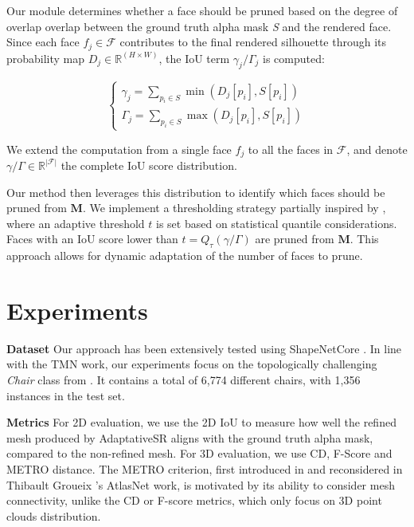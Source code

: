 Our module determines whether a face should be pruned based on the degree of overlap overlap between the ground truth alpha mask \textit{S} and the rendered face. Since each face $f_{j} \in \mathcal{F}$ contributes to the final rendered silhouette through its probability map $D_{j}\in \mathbb{R}^{(H\times W)}$, the \ac{IoU} term $\gamma_{j}/\Gamma_{j}$ is computed: 

\begin{equation}
\begin{cases}
     \gamma_{j}=\sum_{p_{i}\in S} \min \left(  D_{j}[p_{i}] , S[p_{i}] \right) \\
     \Gamma_{j}=\sum_{p_{i}\in S} \max \left( D_{j}[p_{i}],S[p_{i}] \right)
\end{cases}
\end{equation}

We extend the computation from a single face $f_{j}$ to all the faces in $\mathcal{F}$, and denote $\gamma/\Gamma \in \mathbb{R}^{|\mathcal{F}|}$ the complete \ac{IoU} score distribution.

Our method then leverages this distribution to identify which faces should be pruned from $\mathbf{M}$. We implement a thresholding strategy partially inspired by \citep{pan2019deep}, where an adaptive threshold $t$ is set based on statistical quantile considerations. Faces with an \ac{IoU} score lower than $t=Q_{\tau}(\gamma/\Gamma)$ are pruned from $\mathbf{M}$. This approach allows for dynamic adaptation of the number of faces to prune. 

\section{Experiments}
\label{sec:experiments}

\textbf{Dataset} Our approach has been extensively tested using ShapeNetCore \citep{chang2015shapenet}. In line with the TMN work\citep{pan2019deep}, our experiments focus on the topologically challenging \textit{Chair} class from \citep{chang2015shapenet}. It contains a total of 6,774 different chairs, with 1,356 instances in the test set.

\noindent\textbf{Metrics} For 2D evaluation, we use the 2D \ac{IoU} to measure how well the refined mesh produced by AdaptativeSR aligns with the ground truth alpha mask, compared to the non-refined mesh. For 3D evaluation, we use  \ac{CD}, F-Score and METRO distance. The METRO criterion, first introduced in \citep{cignoni1998metro} and reconsidered in Thibault Groueix \etal 's AtlasNet \citep{groueix2018papier} work, is motivated by its ability to consider mesh connectivity, unlike the \ac{CD} or F-score metrics, which only focus on 3D point clouds distribution. 

